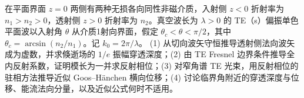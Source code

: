在平面界面 \(z=0\) 两侧有两种无损各向同性非磁介质，入射侧 \(z<0\) 折射率为 \(n_1>n_2>0\)，透射侧 \(z>0\) 折射率为 \(n_2\)。真空波长为 \(\lambda>0\) 的 TE（s）偏振单色平面波以入射角 \(\theta\) 从介质1射向界面，假定 \(\theta_c<\theta<\pi/2\)，其中 \(\theta_c=\arcsin(n_2/n_1)\)。记 \(k_0=2\pi/\lambda\)。
(1) 从切向波矢守恒推导透射侧法向波矢成为虚数，并求倏逝场的 \(1/e\) 振幅穿透深度；(2) 由 TE Fresnel 边界条件推导全内反射系数，证明模长为一并求反射相位；(3) 对窄角谱 TE 光束，用反射相位的驻相方法推导近似 Goos–Hänchen 横向位移；(4) 讨论临界角附近的穿透深度与位移、能流法向分量，以及近似公式何时不适用。

